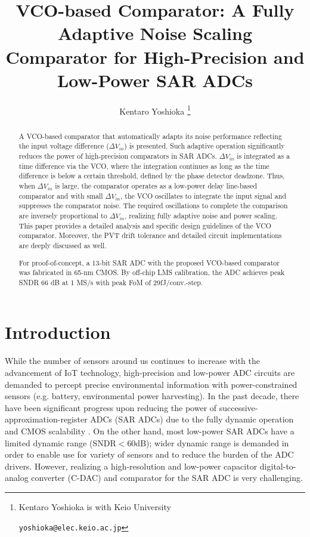 \documentclass[journal]{IEEEtran}
\title{\LARGE \bf
VCO-based Comparator: A Fully Adaptive Noise Scaling Comparator for High-Precision and Low-Power SAR ADCs
}
\author{Kentaro Yoshioka%
\thanks{Kentaro Yoshioka is with Keio University

        {\tt\small yoshioka@elec.keio.ac.jp}}
}
\begin{document}
\maketitle
\thispagestyle{empty}
\pagestyle{empty}

\begin{abstract}
A VCO-based comparator that automatically adapts its noise performance reflecting the input voltage difference ($\Delta V_{in}$) is presented. Such adaptive operation significantly reduces the power of high-precision comparators in SAR ADCs.
$\Delta V_{in}$ is integrated as a time difference via the VCO, where the integration continues as long as the time difference is below a certain threshold, defined by the phase detector deadzone.
Thus, when $\Delta V_{in}$ is large, the comparator operates as a low-power delay line-based comparator and with small $\Delta V_{in}$, the VCO oscillates to integrate the input signal and suppresses the comparator noise.
The required oscillations to complete the comparison are inversely proportional to $\Delta V_{in}$, realizing fully adaptive noise and power scaling. 
This paper provides a detailed analysis and specific design guidelines of the VCO comparator. Moreover, the PVT drift tolerance and detailed circuit implementations are deeply discussed as well.

For proof-of-concept, a 13-bit SAR ADC with the proposed VCO-based comparator was fabricated in 65-nm CMOS. By off-chip LMS calibration, the ADC achieves peak SNDR 66 dB at 1 MS/s with peak FoM of 29fJ/conv.-step.


\end{abstract}

\section{Introduction}
While the number of sensors around us continues to increase with the advancement of IoT technology, high-precision and low-power ADC circuits are demanded to percept precise environmental information with power-constrained sensors (e.g. battery, environmental power harvesting). In the past decade, there have been significant progress upon reducing the power of successive-approximation-register ADCs (SAR ADCs) due to the fully dynamic operation and CMOS scalability \cite{van201010,shikata20120,yoshioka201010,yoshioka20148,zhu201010,tai201411}. On the other hand, most low-power SAR ADCs have a limited dynamic range (SNDR$<$60dB); wider dynamic range is demanded in order to enable use for variety of sensors and to reduce the burden of the ADC drivers. However, realizing a high-resolution and low-power capacitor digital-to-analog converter (C-DAC) and comparator for the SAR ADC is very challenging.
\end{document}
